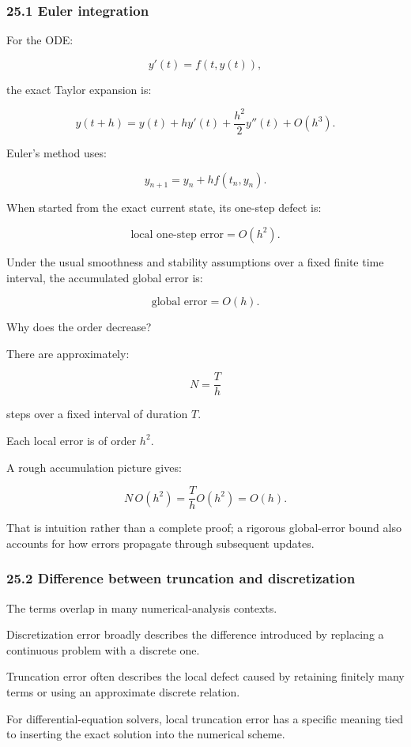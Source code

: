 \subsubsection{25.1 Euler integration}\label{euler-integration}

For the ODE:

\[ y'(t)=f(t,y(t)), \]

the exact Taylor expansion is:

\[ y(t+h) = y(t)+hy'(t)+\frac{h^2}{2}y''(t)+O(h^3). \]

Euler's method uses:

\[ y_{n+1}=y_n+hf(t_n,y_n). \]

When started from the exact current state, its one-step defect is:

\[ \boxed{ \text{local one-step error}=O(h^2) }. \]

Under the usual smoothness and stability assumptions over a fixed finite time interval, the accumulated global error is:

\[ \boxed{ \text{global error}=O(h) }. \]

Why does the order decrease?

There are approximately:

\[ N=\frac Th \]

steps over a fixed interval of duration \(T\).

Each local error is of order \(h^2\).

A rough accumulation picture gives:

\[ N\,O(h^2) = \frac Th O(h^2) = O(h). \]

That is intuition rather than a complete proof; a rigorous global-error bound also accounts for how errors propagate through subsequent updates.

\subsubsection{25.2 Difference between truncation and discretization}\label{difference-between-truncation-and-discretization}

The terms overlap in many numerical-analysis contexts.

Discretization error broadly describes the difference introduced by replacing a continuous problem with a discrete one.

Truncation error often describes the local defect caused by retaining finitely many terms or using an approximate discrete relation.

For differential-equation solvers, local truncation error has a specific meaning tied to inserting the exact solution into the numerical scheme.

